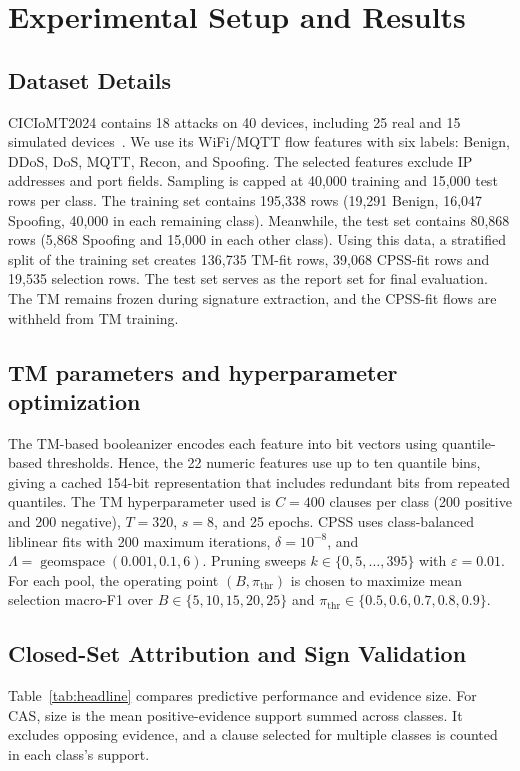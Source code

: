 \documentclass[conference]{IEEEtran}
\begin{document}
\section{Experimental Setup and Results}
\label{sec:setup}
\subsection{Dataset Details}
CICIoMT2024 contains 18 attacks on 40 devices, including 25 real
and 15 simulated devices~\cite{dadkhah2024}. We use its WiFi/MQTT
flow features with six labels: Benign, DDoS, DoS, MQTT, Recon, and
Spoofing. The selected features exclude IP addresses and port fields.
Sampling is capped at 40,000 training and 15,000 test rows per class.
The training set contains 195,338 rows (19,291 Benign, 16,047
Spoofing, 40,000 in each remaining class). Meanwhile, the test set contains
80,868 rows (5,868 Spoofing and 15,000 in each other class). Using this data, a stratified split of the training set creates 136,735 TM-fit rows,
39,068 CPSS-fit rows and 19,535 selection rows. The test set serves
as the report set for final evaluation. The TM remains frozen during
signature extraction, and the CPSS-fit flows are withheld from TM
training.
\subsection{TM parameters and hyperparameter optimization}
The TM-based booleanizer encodes each feature into bit vectors using quantile-based thresholds. Hence,
the 22 numeric features use up to ten quantile bins, giving a cached
154-bit representation that includes redundant bits from repeated
quantiles. The TM hyperparameter used is $C=400$ clauses per class (200 positive and
200 negative), $T=320$, $s=8$, and 25 epochs.
CPSS uses class-balanced liblinear fits with 200 maximum iterations,
$\delta=10^{-8}$, and $\Lambda=\operatorname{geomspace}(0.001,0.1,6)$.
Pruning sweeps $k\in\{0,5,\ldots,395\}$ with $\varepsilon=0.01$.
For each pool, the operating point $(B,\pi_{\mathrm{thr}})$ is chosen
to maximize mean selection macro-F1 over
$B\in\{5,10,15,20,25\}$ and
$\pi_{\mathrm{thr}}\in\{0.5,0.6,0.7,0.8,0.9\}$.

\subsection{Closed-Set Attribution and Sign Validation}
\label{sec:taska}\label{sec:validation}
Table~\ref{tab:headline} compares predictive performance and evidence
size. For CAS, size is the mean positive-evidence support summed across
classes. It excludes opposing evidence, and a clause selected for
multiple classes is counted in each class's support.
\end{document}
